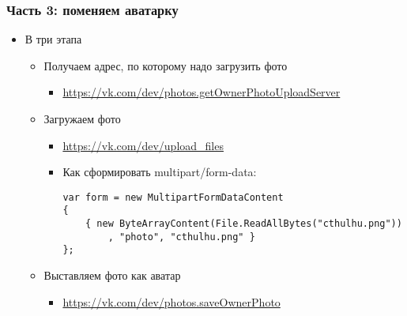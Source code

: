 \documentclass[xetex,mathserif,serif]{beamer}
\begin{document}
    \begin{frame}[fragile]
        \frametitle{Часть 3: поменяем аватарку}
        \begin{itemize}
            \item В три этапа
            \begin{itemize}
                \item Получаем адрес, по которому надо загрузить фото 
                \begin{itemize}
                    \item \url{https://vk.com/dev/photos.getOwnerPhotoUploadServer}
                \end{itemize}
                \item Загружаем фото
                \begin{itemize}
                    \item \url{https://vk.com/dev/upload_files}
                    \item Как сформировать multipart/form-data:
                    \begin{verbatim}
var form = new MultipartFormDataContent
{
    { new ByteArrayContent(File.ReadAllBytes("cthulhu.png"))
        , "photo", "cthulhu.png" }
};
                    \end{verbatim}
                \end{itemize}
                \item Выставляем фото как аватар
                \begin{itemize}
                    \item \url{https://vk.com/dev/photos.saveOwnerPhoto}
                \end{itemize}
            \end{itemize}
        \end{itemize}
    \end{frame}
\end{document}
